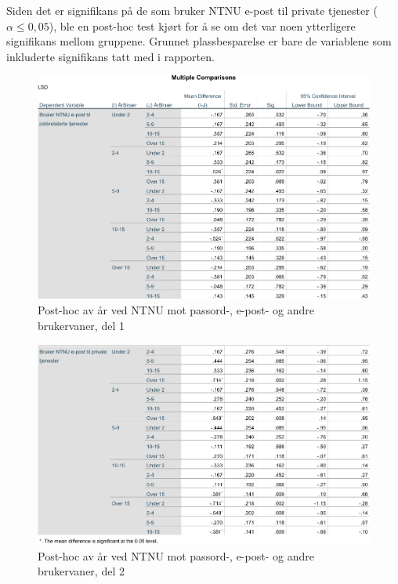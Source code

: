 Siden det er signifikans på de som bruker NTNU e-post til private tjenester (\(\alpha \leq 0,05\)), ble en post-hoc test kjørt for å se om det var noen ytterligere signifikans mellom gruppene. Grunnet plassbesparelse er bare de variablene som inkluderte signifikans tatt med i rapporten. 

\begin{figure}[H]
    \centering
    \includegraphics[scale=0.7]{case_2/bilder/spss/anova_ttest/ansiennitet_diverse_posthoc_1.pdf}
    \caption[Post-hoc av år ved NTNU mot passord-, e-post- og andre brukervaner del 1]{Post-hoc av år ved NTNU mot passord-, e-post- og andre brukervaner, del 1}
    \label{fig:alder-bevissthetogkjennskap-posthoc-1}
\end{figure}

\begin{figure}[H]
    \centering
    \includegraphics[scale=0.7]{case_2/bilder/spss/anova_ttest/ansiennitet_diverse_posthoc_2.pdf}
    \caption[Post-hoc av år ved NTNU mot passord-, e-post- og andre brukervaner del 2]{Post-hoc av år ved NTNU mot passord-, e-post- og andre brukervaner, del 2}
    \label{fig:alder-bevissthetogkjennskap-posthoc-2}
\end{figure}

